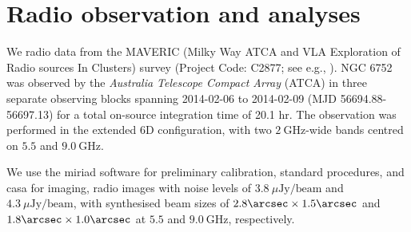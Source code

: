 \documentclass[fleqn,usenatbib]{mnras}
\newcommand{\ujy}{\mu\mathrm{Jy}}
\newcommand{\revised}[1]{{\color{black}{#1}}}
\begin{document}
\begin{table}
    \caption{Variability indices of sources that show strong variability in one or more Obs. IDs.}
    \centering
    \label{t:variability_indices}
\end{table}



\section{Radio observation and analyses}
\label{s:radio_observation}
We %
\revised{use} 
radio data from the MAVERIC (Milky Way ATCA and VLA Exploration of Radio sources In Clusters) survey (Project Code: C2877; see e.g., \citealt{Tremou18}). NGC 6752 was observed by the {\it Australia Telescope Compact Array} (ATCA) in three separate observing blocks spanning 2014-02-06 to 2014-02-09 (MJD 56694.88-56697.13) for a total on-source integration time of 20.1 hr. The observation was performed in the extended 6D configuration, with two $2~\mathrm{GHz}$-wide bands centred on $5.5$ and $9.0~\mathrm{GHz}$. 

We use the {\sc miriad} software \citep{Sault95} for preliminary calibration, %
\revised{via} 
standard procedures, and {\sc casa} \citep[version 4.2.0;][]{McMullin07} for imaging, %
\revised{making} 
radio images with noise levels of $3.8~\ujy/\mathrm{beam}$ and $4.3~\ujy/\mathrm{beam}$, with synthesised beam sizes of $2.8\arcsec\times 1.5\arcsec$ and $1.8\arcsec \times 1.0\arcsec$ at $5.5$ and $9.0~\mathrm{GHz}$, respectively.
\end{document}
